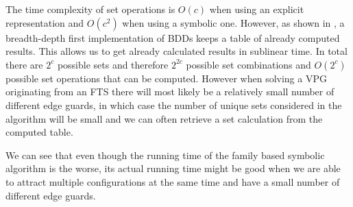 The time complexity of set operations is $O(c)$ when using an explicit representation and $O(c^2)$ when using a symbolic one. However, as shown in \cite{BDD_running_time}, a breadth-depth first implementation of BDDs keeps a table of already computed results. This allows us to get already calculated results in sublinear time. In total there are $2^c$ possible sets and therefore $2^{2c}$ possible set combinations and $O(2^c)$ possible set operations that can be computed. However when solving a VPG originating from an FTS there will most likely be a relatively small number of different edge guards, in which case the number of unique sets considered in the algorithm will be small and we can often retrieve a set calculation from the computed table.

We can see that even though the running time of the family based symbolic algorithm is the worse, its actual running time might be good when we are able to attract multiple configurations at the same time and have a small number of different edge guards.